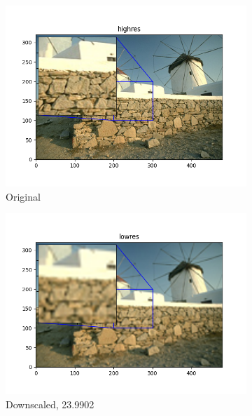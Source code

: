 \documentclass[12pt]{article}
\begin{document}
\begin{figure}[h!]
  \begin{subfigure}[b]{0.32\linewidth}
    \includegraphics[width=\linewidth]{./6-highres.png}
    \caption{Original}
  \end{subfigure}
  \hfill
  \begin{subfigure}[b]{0.32\linewidth}
    \includegraphics[width=\linewidth]{./6-lowres.png}
    \caption{Downscaled, 23.9902}
  \end{subfigure}
  \hfill
  \begin{subfigure}[b]{0.32\linewidth}

\end{subfigure}
\end{figure}
\end{document}
